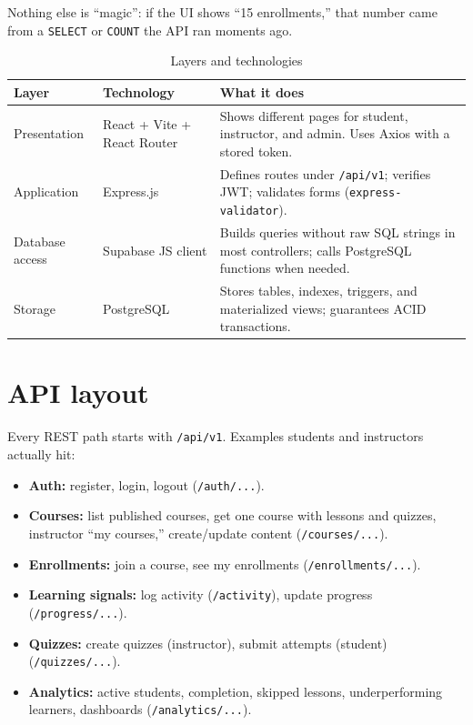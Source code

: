 Nothing else is ``magic'': if the UI shows ``15 enrollments,'' that number came from a \texttt{SELECT} or \texttt{COUNT} the API ran moments ago.

\begin{table}[htbp]
\centering
\caption{Layers and technologies}
\label{tab:layers}
\begin{tabular}{@{}llp{6.8cm}@{}}
\toprule
\textbf{Layer} & \textbf{Technology} & \textbf{What it does} \\
\midrule
Presentation & React + Vite + React Router &
Shows different pages for student, instructor, and admin. Uses Axios with a stored token. \\
Application & Express.js &
Defines routes under \texttt{/api/v1}; verifies JWT; validates forms (\texttt{express-validator}). \\
Database access & Supabase JS client &
Builds queries without raw SQL strings in most controllers; calls PostgreSQL functions when needed. \\
Storage & PostgreSQL &
Stores tables, indexes, triggers, and materialized views; guarantees ACID transactions. \\
\bottomrule
\end{tabular}
\end{table}

\section{API layout}
Every REST path starts with \texttt{/api/v1}. Examples students and instructors actually hit:

\begin{itemize}[leftmargin=*]
  \item \textbf{Auth:} register, login, logout (\texttt{/auth/...}).
  \item \textbf{Courses:} list published courses, get one course with lessons and quizzes, instructor ``my courses,'' create/update content (\texttt{/courses/...}).
  \item \textbf{Enrollments:} join a course, see my enrollments (\texttt{/enrollments/...}).
  \item \textbf{Learning signals:} log activity (\texttt{/activity}), update progress (\texttt{/progress/...}).
  \item \textbf{Quizzes:} create quizzes (instructor), submit attempts (student) (\texttt{/quizzes/...}).
  \item \textbf{Analytics:} active students, completion, skipped lessons, underperforming learners, dashboards (\texttt{/analytics/...}).
\end{itemize}

